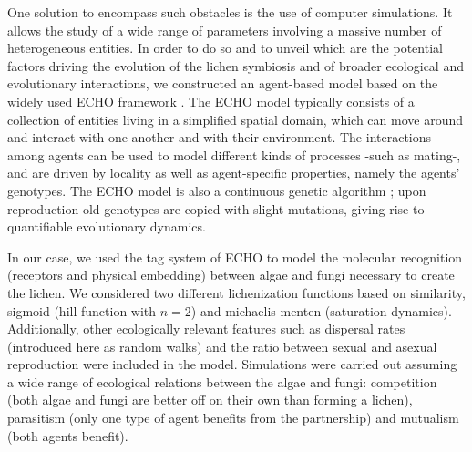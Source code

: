 \documentclass[runningheads,a4paper]{llncs}
\begin{document}
%

One solution to encompass such obstacles is the use of computer simulations. It allows the study of a wide range of parameters involving a massive number of heterogeneous entities. 
In order to do so and to unveil which are the potential factors driving the evolution of the lichen symbiosis and of broader ecological and evolutionary interactions, we constructed an agent-based model based on the widely used ECHO framework \cite{holland1999echoing,holland1995hidden}. The ECHO model typically consists of a collection of entities living in a simplified spatial domain, which can move around and interact with one another and with their environment. The interactions among agents can be used to model different kinds of processes -such as mating-, and are driven by locality as well as agent-specific properties, namely the agents' genotypes. The ECHO model is also a continuous genetic algorithm \cite{mitchell1998introduction}; upon reproduction old genotypes are copied with slight mutations, giving rise to quantifiable evolutionary dynamics.

In our case, we used the tag system of ECHO to model the molecular recognition (receptors and physical embedding) between algae and fungi necessary to create the lichen. We considered two different lichenization functions based on similarity, sigmoid (hill function with $n=2$) and michaelis-menten (saturation dynamics). Additionally, other ecologically relevant features such as dispersal rates (introduced here as random walks) and the ratio between sexual and asexual reproduction were included in the model. Simulations were carried out assuming a wide range of ecological relations between the algae and fungi: competition (both algae and fungi are better off on their own than forming a lichen), parasitism (only one type of agent benefits from the partnership) and mutualism (both agents benefit).
\end{document}

